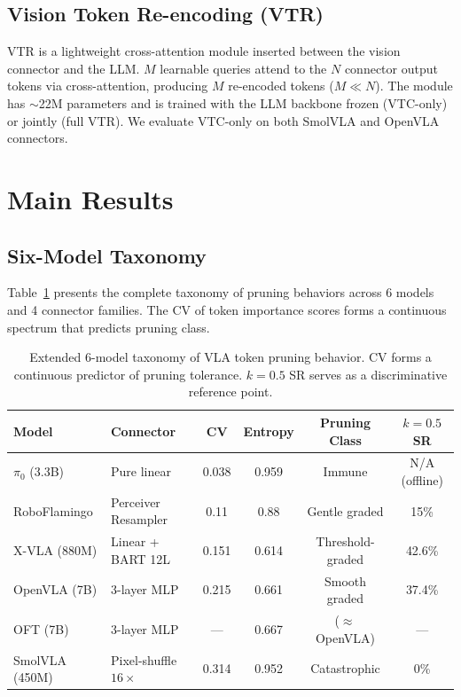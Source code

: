 \documentclass[letterpaper]{article}
\begin{document}
\subsection{Vision Token Re-encoding (VTR)}

VTR is a lightweight cross-attention module inserted between the vision connector and the LLM. $M$ learnable queries attend to the $N$ connector output tokens via cross-attention, producing $M$ re-encoded tokens ($M \ll N$). The module has $\sim$22M parameters and is trained with the LLM backbone frozen (VTC-only) or jointly (full VTR). We evaluate VTC-only on both SmolVLA and OpenVLA connectors.

\section{Main Results}

\subsection{Six-Model Taxonomy}

Table~\ref{tab:taxonomy} presents the complete taxonomy of pruning behaviors across 6 models and 4 connector families. The CV of token importance scores forms a continuous spectrum that predicts pruning class.

\begin{table}[h]
\centering
\caption{Extended 6-model taxonomy of VLA token pruning behavior. CV forms a continuous predictor of pruning tolerance. $k{=}0.5$ SR serves as a discriminative reference point.}
\label{tab:taxonomy}
\small
\begin{tabular}{llcccc}
\toprule
\textbf{Model} & \textbf{Connector} & \textbf{CV} & \textbf{Entropy} & \textbf{Pruning Class} & \textbf{$k{=}0.5$ SR} \\
\midrule
$\pi_0$ (3.3B) & Pure linear & 0.038 & 0.959 & Immune & N/A (offline) \\
RoboFlamingo & Perceiver Resampler & 0.11 & 0.88 & Gentle graded & 15\% \\
X-VLA (880M) & Linear + BART 12L & 0.151 & 0.614 & Threshold-graded & 42.6\% \\
OpenVLA (7B) & 3-layer MLP & 0.215 & 0.661 & Smooth graded & 37.4\% \\
OFT (7B) & 3-layer MLP & --- & 0.667 & ($\approx$ OpenVLA) & --- \\
SmolVLA (450M) & Pixel-shuffle $16\times$ & 0.314 & 0.952 & Catastrophic & 0\% \\
\bottomrule
\end{tabular}
\end{table}
\end{document}
